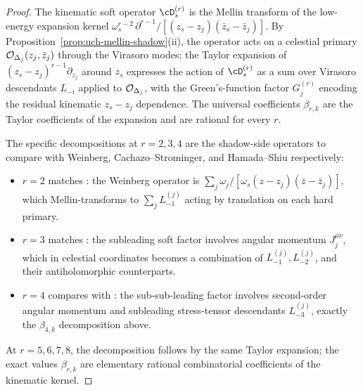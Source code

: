 \begin{proof}
The kinematic soft operator $\cD_s^{(r)}$ is the Mellin transform of
the low-energy expansion kernel
$\omega_s^{r - 2}\, \partial^{r - 1} / [(z_s - z_j)(\bar z_s - \bar z_j)]$.
By Proposition~\ref{prop:uch-mellin-shadow}(ii), the operator acts on a
celestial primary $\mathcal O_{\Delta_j}(z_j, \bar z_j)$ through the Virasoro
modes; the Taylor expansion of $(z_s - z_j)^{r - 1}\partial_{z_j}$
around $z_s$ expresses the action of $\cD_s^{(r)}$ as a sum over
Virasoro descendants $L_{-i}$ applied to $\mathcal O_{\Delta_j}$, with the
Green's-function factor $G_j^{(r)}$ encoding the residual kinematic
$z_s - z_j$ dependence. The universal coefficients $\beta_{r, k}$ are
the Taylor coefficients of the expansion and are rational for every
$r$.

The specific decompositions at $r = 2, 3, 4$ are the shadow-side
operators to compare with Weinberg, Cachazo--Strominger, and
Hamada--Shiu respectively:
\begin{itemize}
\item $r = 2$ matches \cite{Weinberg65,StromingerLectures2018}: the
Weinberg operator is $\sum_j \omega_j / [\omega_s (z - z_j)(\bar z -
\bar z_j)]$, which Mellin-transforms to $\sum_j L_{-1}^{(j)}$ acting
by translation on each hard primary.
\item $r = 3$ matches
\cite{CachazoStrominger14,StromingerLectures2018}: the
subleading soft factor involves angular momentum $J^{\mu \nu}_j$,
which in celestial coordinates becomes a combination of
$L_{-1}^{(j)}, L_{-2}^{(j)}$, and their antiholomorphic counterparts.
\item $r = 4$ compares with \cite{HamadaShiuSubsubSoft}:
the sub-sub-leading factor involves second-order angular momentum and
subleading stress-tensor descendants $L_{-3}^{(j)}$, exactly the
$\beta_{4, k}$ decomposition above.
\end{itemize}
At $r = 5, 6, 7, 8$, the decomposition follows by the same Taylor
expansion; the exact values $\beta_{r, k}$ are elementary rational
combinatorial coefficients of the kinematic kernel.
\end{proof}

